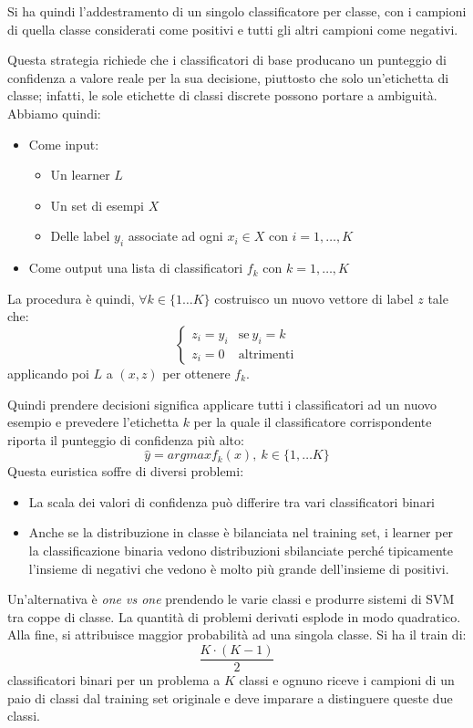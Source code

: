 Si ha quindi l'addestramento di un singolo classificatore per classe, con i campioni
di quella classe considerati come positivi e tutti gli altri campioni come negativi.

Questa strategia richiede che i classificatori di base producano un punteggio di
confidenza a valore reale per la sua decisione, piuttosto che solo un'etichetta
di classe; infatti, le sole etichette di classi discrete possono portare a ambiguità.
Abbiamo quindi:
\begin{itemize}
    \item Come input:
          \begin{itemize}
              \item Un learner $L$
              \item Un set di esempi $X$
              \item Delle label $y_i$ associate ad ogni $x_i \in X$ con $i = 1, \dots, K$
          \end{itemize}
    \item Come output una lista di classificatori $f_k$ con $k = 1,\dots, K$
\end{itemize}
La procedura è quindi, $\forall k \in \{1 \dots K\}$ costruisco un nuovo vettore
di label $z$ tale che:
\begin{equation}
    \begin{cases}
        z_i = y_i & \text{se} \ y_i = k \\
        z_i = 0   & \text{altrimenti}
    \end{cases}
\end{equation}
applicando poi $L$ a $(x, z)$ per ottenere $f_k$.

Quindi prendere decisioni significa applicare tutti i classificatori ad un nuovo
esempio e prevedere l'etichetta $k$ per la quale il classificatore corrispondente
riporta il punteggio di confidenza più alto:
\begin{equation}
    \hat{y} = argmax f_k(x), \ k \in \{1,\dots K\}
\end{equation}
Questa euristica soffre di diversi problemi:
\begin{itemize}
    \item La scala dei valori di confidenza può differire tra vari classificatori
          binari
    \item Anche se la distribuzione in classe è bilanciata nel training set, i
          learner per la classificazione binaria vedono distribuzioni sbilanciate
          perché tipicamente l'insieme di negativi che vedono è molto più grande
          dell'insieme di positivi.
\end{itemize}
Un'alternativa è \textit{one vs one} prendendo le varie classi e produrre sistemi
di SVM tra coppe di classe. La quantità di problemi derivati esplode in modo
quadratico. Alla fine, si attribuisce maggior probabilità ad una singola classe.
Si ha il train di:
\begin{equation}
    \frac{K \cdot (K - 1)}{2}
\end{equation}
classificatori binari per un problema a $K$ classi e ognuno riceve i campioni di
un paio di classi dal training set originale e deve imparare a distinguere queste
due classi.

